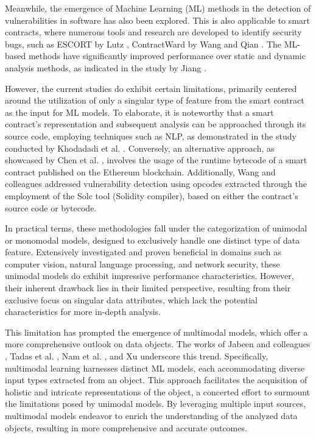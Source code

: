  Meanwhile, the emergence of Machine Learning (ML) methods in the detection of vulnerabilities in software has also been explored. This is also applicable to smart contracts, where numerous tools and research are developed to identify security bugs, such as ESCORT by Lutz \cite{lutz2021escort}, ContractWard by Wang \cite{wang_contractward} and Qian \cite{qian_auto_squen_mol}. The ML-based methods have significantly improved performance over static and dynamic analysis methods, as indicated in the study by Jiang \cite{jiang_sur_smartcontr}. 

 However, the current studies do exhibit certain limitations, primarily centered around the utilization of only a singular type of feature from the smart contract as the input for ML models. To elaborate, it is noteworthy that a smart contract's representation and subsequent analysis can be approached through its source code, employing techniques such as NLP, as demonstrated in the study conducted by Khodadadi et al. \cite{khodadadi2023hymo}. Conversely, an alternative approach, as showcased by Chen et al. \cite{Chen_defec_check_2022}, involves the usage of the runtime bytecode of a smart contract published on the Ethereum blockchain. Additionally, Wang and colleagues \cite{wang_contractward} addressed vulnerability detection using opcodes extracted through the employment of the Solc tool \cite{Solidity} (Solidity compiler), based on either the contract's source code or bytecode.

In practical terms, these methodologies fall under the categorization of unimodal or monomodal models, designed to exclusively handle one distinct type of data feature. Extensively investigated and proven beneficial in domains such as computer vision, natural language processing, and network security, these unimodal models do exhibit impressive performance characteristics. However, their inherent drawback lies in their limited perspective, resulting from their exclusive focus on singular data attributes, which lack the potential characteristics for more in-depth analysis.

This limitation has prompted the emergence of multimodal models, which offer a more comprehensive outlook on data objects. The works of Jabeen and colleagues \cite{summaira2022review}, Tadas et al. \cite{Tadas2019_multimodal_survey}, Nam et al. \cite{nam2023survey}, and Xu \cite{xu2023_multimodal_trans_sur} underscore this trend. Specifically, multimodal learning harnesses distinct ML models, each accommodating diverse input types extracted from an object. This approach facilitates the acquisition of holistic and intricate representations of the object, a concerted effort to surmount the limitations posed by unimodal models. By leveraging multiple input sources, multimodal models endeavor to enrich the understanding of the analyzed data objects, resulting in more comprehensive and accurate outcomes.


